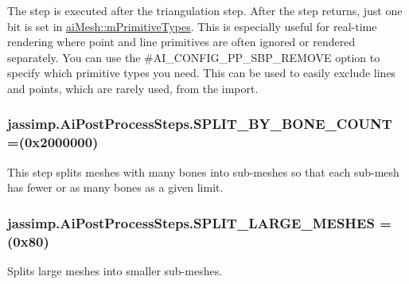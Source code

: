{The step is executed after the triangulation step. After the step returns, just one bit is set in \hyperlink{structai_mesh_a99d66ac0a444068c1b252b30265cbf53}{ai\+Mesh\+::m\+Primitive\+Types}. This is especially useful for real-\/time rendering where point and line primitives are often ignored or rendered separately. You can use the {\ttfamily \#\+A\+I\+\_\+\+C\+O\+N\+F\+I\+G\+\_\+\+P\+P\+\_\+\+S\+B\+P\+\_\+\+R\+E\+M\+O\+V\+E} option to specify which primitive types you need. This can be used to easily exclude lines and points, which are rarely used, from the import. \hypertarget{enumjassimp_1_1_ai_post_process_steps_a5a8d0677d4d0faf473ed2d9c808e74d6}{
\subsubsection[{S\+P\+L\+I\+T\+\_\+\+B\+Y\+\_\+\+B\+O\+N\+E\+\_\+\+C\+O\+U\+N\+T}]{\setlength{\rightskip}{0pt plus 5cm}jassimp.\+Ai\+Post\+Process\+Steps.\+S\+P\+L\+I\+T\+\_\+\+B\+Y\+\_\+\+B\+O\+N\+E\+\_\+\+C\+O\+U\+N\+T =(0x2000000)}}\label{enumjassimp_1_1_ai_post_process_steps_a5a8d0677d4d0faf473ed2d9c808e74d6}
This step splits meshes with many bones into sub-\/meshes so that each sub-\/mesh has fewer or as many bones as a given limit.\hypertarget{enumjassimp_1_1_ai_post_process_steps_a94fd8430f743bab4c0b844e0674a4dbf}{
\subsubsection[{S\+P\+L\+I\+T\+\_\+\+L\+A\+R\+G\+E\+\_\+\+M\+E\+S\+H\+E\+S}]{\setlength{\rightskip}{0pt plus 5cm}jassimp.\+Ai\+Post\+Process\+Steps.\+S\+P\+L\+I\+T\+\_\+\+L\+A\+R\+G\+E\+\_\+\+M\+E\+S\+H\+E\+S =(0x80)}}\label{enumjassimp_1_1_ai_post_process_steps_a94fd8430f743bab4c0b844e0674a4dbf}
Splits large meshes into smaller sub-\/meshes.

}
